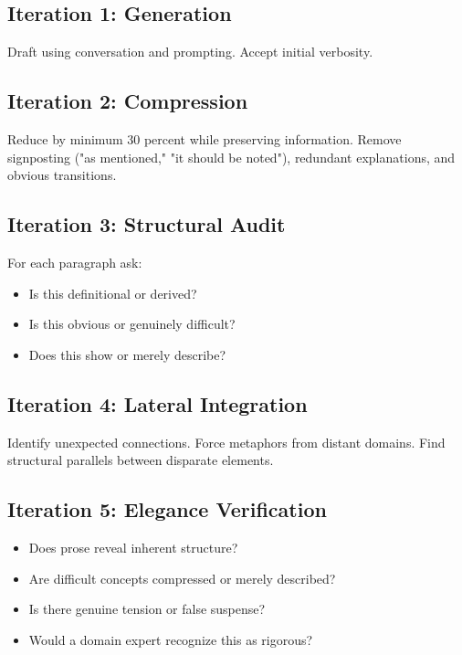 \subsection*{Iteration 1: Generation}

Draft using conversation and prompting. Accept initial verbosity.

\subsection*{Iteration 2: Compression}

Reduce by minimum 30 percent while preserving information. Remove signposting ("as mentioned," "it should be noted"), redundant explanations, and obvious transitions.

\subsection*{Iteration 3: Structural Audit}

For each paragraph ask:

\begin{itemize}
\item Is this definitional or derived?
\item Is this obvious or genuinely difficult?
\item Does this show or merely describe?
\end{itemize}

\subsection*{Iteration 4: Lateral Integration}

Identify unexpected connections. Force metaphors from distant domains. Find structural parallels between disparate elements.

\subsection*{Iteration 5: Elegance Verification}

\begin{itemize}
\item Does prose reveal inherent structure?
\item Are difficult concepts compressed or merely described?
\item Is there genuine tension or false suspense?
\item Would a domain expert recognize this as rigorous?
\end{itemize}

